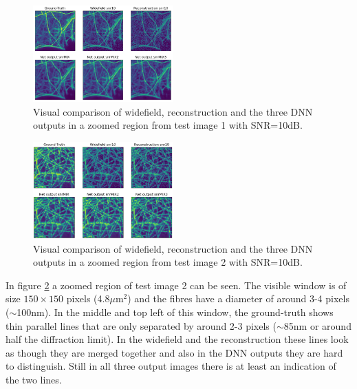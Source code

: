 \documentclass[conference]{IEEEtran}
\begin{document}
\begin{figure}[h]
    \centering
    \includegraphics[width=0.48\textwidth]{images/test_img_4_model_comp_snr10.png}
    \caption{Visual comparison of widefield, reconstruction and the three DNN outputs in a zoomed region from test image 1 with SNR=10dB.}
    \label{fig:test_img_4_model_comp_snr10}
\end{figure}
\begin{figure}[h]
    \centering
    \includegraphics[width=0.48\textwidth]{images/test_img_2_model_comp_snr10.png}
    \caption{Visual comparison of widefield, reconstruction and the three DNN outputs in a zoomed region from test image 2 with SNR=10dB.}
    \label{fig:test_img_2_model_comp_snr10}
\end{figure}

In figure \ref{fig:test_img_2_model_comp_snr10} a zoomed region of test image 2 can be seen. The visible window is of size $150 \times 150$ pixels (4.8$\mu$m$^2$) and the fibres have a diameter of around 3-4 pixels ($\sim$100nm). In the middle and top left of this window, the ground-truth shows thin parallel lines that are only separated by around 2-3 pixels ($\sim$85nm or around half the diffraction limit). In the widefield and the reconstruction these lines look as though they are merged together and also in the DNN outputs they are hard to distinguish. Still in all three output images there is at least an indication of the two lines.
\end{document}
